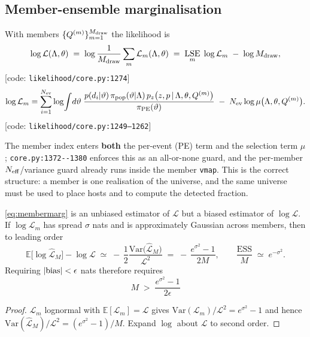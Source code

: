 \subsection{Member-ensemble marginalisation}

With members $\{Q^{(m)}\}_{m=1}^{M_{\rm draw}}$ the likelihood is
\begin{equation}
  \log\mathcal L(\Lambda,\theta)
  \;=\;\log\frac1{M_{\rm draw}}\sum_{m}\mathcal L_m(\Lambda,\theta)
  \;=\;\mathop{\mathrm{LSE}}_m\;\log\mathcal L_m\;-\;\log M_{\rm draw},
  \label{eq:membermarg}
\end{equation}
\hfill[code: \texttt{likelihood/core.py:1274}]
\begin{equation}
  \log\mathcal L_m=\sum_{i=1}^{N_{\rm ev}}
  \log\!\int\! d\vartheta\;
  \frac{p(d_i|\vartheta)\,\pi_{\rm pop}(\vartheta|\Lambda)\,
        p_z\big(z,p\,|\,\Lambda,\theta,Q^{(m)}\big)}{\pi_{\rm PE}(\vartheta)}
  \;-\;N_{\rm ev}\log\mu\big(\Lambda,\theta,Q^{(m)}\big).
  \label{eq:Lm}
\end{equation}
\hfill[code: \texttt{likelihood/core.py:1249--1262}]

\noindent The member index enters \textbf{both} the per-event (PE) term and the
selection term $\mu$; \verb|core.py:1372--1380| enforces this as an all-or-none
guard, and the per-member $N_{\rm eff}$/variance guard already runs inside the
member \verb|vmap|.  This is the correct structure: a member is one realisation
of the universe, and the same universe must be used to place hosts and to
compute the detected fraction.

\begin{proposition}
\label{prop:jensen}
\eqref{eq:membermarg} is an unbiased estimator of $\mathcal L$ but a biased
estimator of $\log\mathcal L$.  If $\log\mathcal L_m$ has spread $\sigma$ nats
and is approximately Gaussian across members, then to leading order
\begin{equation}
  \mathbb E\big[\log\widehat{\mathcal L}_{M}\big]-\log\mathcal L
  \;\simeq\;-\,\frac12\frac{\mathrm{Var}\big(\widehat{\mathcal L}_M\big)}{\mathcal L^2}
  \;=\;-\,\frac{e^{\sigma^2}-1}{2M},
  \qquad
  \frac{\mathrm{ESS}}{M}\;\simeq\;e^{-\sigma^2}.
  \label{eq:jensenbias}
\end{equation}
Requiring $|{\rm bias}|<\epsilon$ nats therefore requires
\begin{equation}
  \boxed{\;M\;>\;\frac{e^{\sigma^2}-1}{2\epsilon}\;}
  \label{eq:Mrequired}
\end{equation}
\end{proposition}
\begin{proof}
$\mathcal L_m$ lognormal with $\mathbb E[\mathcal L_m]=\mathcal L$ gives
$\mathrm{Var}(\mathcal L_m)/\mathcal L^2=e^{\sigma^2}-1$ and hence
$\mathrm{Var}(\widehat{\mathcal L}_M)/\mathcal L^2=(e^{\sigma^2}-1)/M$.
Expand $\log$ about $\mathcal L$ to second order.
\end{proof}

